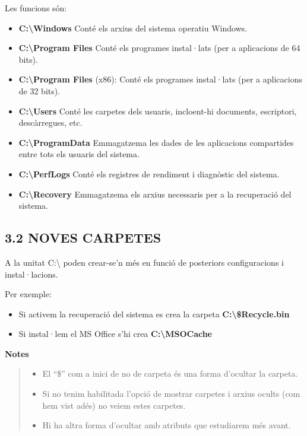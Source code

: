 \documentclass[
  a4paper,
]{article}
\providecommand{\tightlist}{%
  \setlength{\itemsep}{0pt}\setlength{\parskip}{0pt}}
\begin{document}
Les funcions són:

\begin{itemize}
\tightlist
\item
  \textbf{C:\textbackslash Windows} Conté els arxius del sistema
  operatiu Windows.
\item
  \textbf{C:\textbackslash Program Files} Conté els programes
  instal·lats (per a aplicacions de 64 bits).
\item
  \textbf{C:\textbackslash Program Files} (x86): Conté els programes
  instal·lats (per a aplicacions de 32 bits).
\item
  \textbf{C:\textbackslash Users} Conté les carpetes dels usuaris,
  incloent-hi documents, escriptori, descàrregues, etc.
\item
  \textbf{C:\textbackslash ProgramData} Emmagatzema les dades de les
  aplicacions compartides entre tots els usuaris del sistema.
\item
  \textbf{C:\textbackslash PerfLogs} Conté els registres de rendiment i
  diagnòstic del sistema.
\item
  \textbf{C:\textbackslash Recovery} Emmagatzema els arxius necessaris
  per a la recuperació del sistema.
\end{itemize}

\subsection{3.2 NOVES CARPETES}\label{noves-carpetes}

A la unitat C:\textbackslash{} poden crear-se'n més en funció de
posteriors configuracions i instal·lacions.

Per exemple:

\begin{itemize}
\tightlist
\item
  Si activem la recuperació del sistema es crea la carpeta
  \textbf{C:\textbackslash\$Recycle.bin}
\item
  Si instal·lem el MS Office s'hi crea
  \textbf{C:\textbackslash MSOCache}
\end{itemize}

\textbf{Notes}

\begin{quote}
\begin{itemize}
\tightlist
\item
  El ``\$'' com a inici de no de carpeta és una forma d'ocultar la
  carpeta.
\item
  Si no tenim habilitada l'opció de mostrar carpetes i arxius ocults
  (com hem vist adés) no veiem estes carpetes.
\item
  Hi ha altra forma d'ocultar amb atributs que estudiarem més avant.
\end{itemize}
\end{quote}
\end{document}
